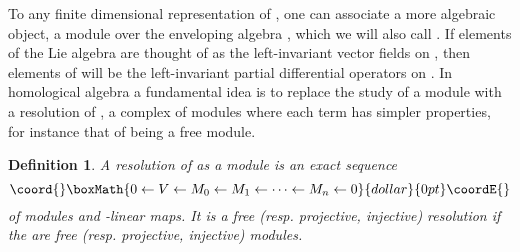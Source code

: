 \documentclass[a4paper,a4paper]{article}
\newtheorem{define}{Definition}
\theoremstyle{conjecture}
\begin{document}
To any finite dimensional representation \coordHE{} of \coordHE{}, one can associate a more algebraic
object, a module over the enveloping algebra \coordHE{}, which we will also call \coordHE{}.
If elements of the Lie algebra \coordHE{} are thought of as the left-invariant vector
fields on \coordHE{}, then elements of \coordHE{} will be the left-invariant partial
differential operators on \coordHE{}.  In homological algebra a fundamental idea is to
replace the study of a \coordHE{} module \coordHE{} with a resolution of \coordHE{}, a complex
of \coordHE{} modules where each term has simpler properties, for instance that
of being a free \coordHE{} module.

\begin{define}
A resolution of \coordHE{} as a \coordHE{} module is an exact
sequence
$$\coord{}\boxMath{0\leftarrow V \leftarrow M_0\leftarrow M_1 \leftarrow \cdots \leftarrow M_n\leftarrow 0}{dollar}{0pt}\coordE{}$$
of \coordHE{} modules and \coordHE{}-linear maps.  It is
a free (resp. projective, injective) resolution if the \coordHE{} are free (resp. projective,
injective) \coordHE{} modules.
\end{define}
\end{document}
